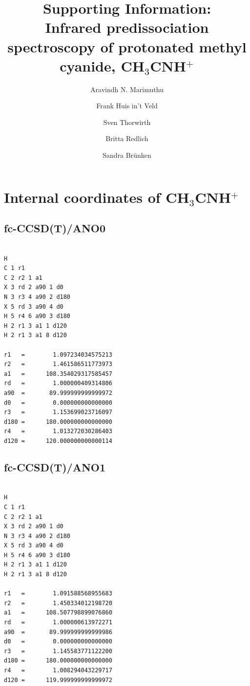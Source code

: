 \documentclass[preprint,12pt]{elsarticle}
\newcommand{\pa}{CH$_3$CNH$^+$ }
\newcommand{\radboud}{Radboud University, Institute for Molecules and Materials, FELIX Laboratory, Toernooiveld 7, 6525 ED Nijmegen, the Netherlands}
\newcommand{\cologne}{I. Physikalisches Institut, Universität zu Köln, Zülpicher Str. 77, 50937 Köln, Germany}
\begin{document}
\begin{frontmatter}
    \title{Supporting Information: \\ Infrared predissociation  spectroscopy of protonated methyl cyanide, \pa}
    
    \author[1]{Aravindh N. Marimuthu}
    \address[1]{\radboud}

    \author[1]{Frank Huis in't Veld}

    \author[3]{Sven Thorwirth}
    \address[3]{\cologne}

    \author[1]{Britta Redlich}

    \author[1]{Sandra Brünken}


\end{frontmatter}

\section*{Internal coordinates of \pa }


\subsection*{fc-CCSD(T)/ANO0}
\begin{verbatim}

H
C 1 r1
C 2 r2 1 a1
X 3 rd 2 a90 1 d0
N 3 r3 4 a90 2 d180
X 5 rd 3 a90 4 d0
H 5 r4 6 a90 3 d180
H 2 r1 3 a1 1 d120
H 2 r1 3 a1 8 d120

r1   =        1.097234034575213
r2   =        1.461586511773973
a1   =      108.354029317585457
rd   =        1.000000409314806
a90  =       89.999999999999972
d0   =        0.000000000000000
r3   =        1.153699023716097
d180 =      180.000000000000000
r4   =        1.013272030286403
d120 =      120.000000000000114

\end{verbatim}
    
\subsection*{fc-CCSD(T)/ANO1}

\begin{verbatim}

H
C 1 r1
C 2 r2 1 a1
X 3 rd 2 a90 1 d0
N 3 r3 4 a90 2 d180
X 5 rd 3 a90 4 d0
H 5 r4 6 a90 3 d180
H 2 r1 3 a1 1 d120
H 2 r1 3 a1 8 d120

r1   =        1.091588568955683
r2   =        1.450334012198720
a1   =      108.507798899076860
rd   =        1.000000613972271
a90  =       89.999999999999986
d0   =        0.000000000000000
r3   =        1.145583771122200
d180 =      180.000000000000000
r4   =        1.008294043229717
d120 =      119.999999999999972

\end{verbatim}
\end{document}

